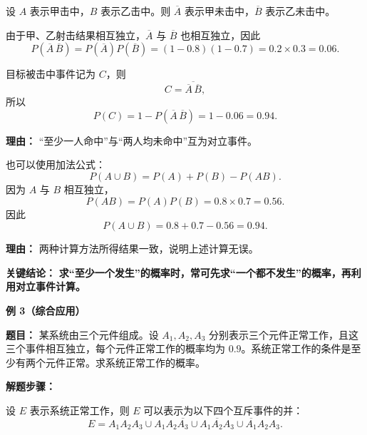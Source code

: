 \begin{examplebox}
\begin{description}[style=nextline, leftmargin=2.8em, labelsep=0.5em, itemsep=0.45em]
    \item[\textbf{第一步（求均不命中概率）：}]
    设 $A$ 表示甲击中，$B$ 表示乙击中。则 $\overline{A}$ 表示甲未击中，$\overline{B}$ 表示乙未击中。

    由于甲、乙射击结果相互独立，$\overline{A}$ 与 $\overline{B}$ 也相互独立，因此
    \[
        P(\overline{A}\,\overline{B})
        =
        P(\overline{A})P(\overline{B})
        =
        (1-0.8)(1-0.7)
        =
        0.2\times 0.3
        =
        0.06.
    \]

    \item[\textbf{第二步（利用对立事件）：}]
    目标被击中事件记为 $C$，则
    \[
        C=\overline{\overline{A}\,\overline{B}},
    \]
    所以
    \[
        P(C)
        =
        1-P(\overline{A}\,\overline{B})
        =
        1-0.06
        =
        0.94.
    \]

    \par\textbf{理由：}
    “至少一人命中”与“两人均未命中”互为对立事件。

    \item[\textbf{第三步（换一种方法核对结果）：}]
    也可以使用加法公式：
    \[
        P(A\cup B)
        =
        P(A)+P(B)-P(AB).
    \]
    因为 $A$ 与 $B$ 相互独立，
    \[
        P(AB)=P(A)P(B)=0.8\times 0.7=0.56.
    \]
    因此
    \[
        P(A\cup B)
        =
        0.8+0.7-0.56
        =
        0.94.
    \]

    \par\textbf{理由：}
    两种计算方法所得结果一致，说明上述计算无误。

\end{description}

\textbf{\textcolor{CExample}{关键结论：}}
\textbf{求“至少一个发生”的概率时，常可先求“一个都不发生”的概率，再利用对立事件计算。}

\medskip

\textbf{\textcolor{CExample}{例 3（综合应用）}}

\textbf{\textcolor{CExample}{题目：}}
某系统由三个元件组成。设 $A_1,A_2,A_3$ 分别表示三个元件正常工作，且这三个事件相互独立，每个元件正常工作的概率均为 $0.9$。系统正常工作的条件是至少有两个元件正常。求系统正常工作的概率。

\textbf{\textcolor{CExample}{解题步骤：}}

\begin{description}[style=nextline, leftmargin=2.8em, labelsep=0.5em, itemsep=0.45em]

    \item[\textbf{第一步（事件分解）：}]
    设 $E$ 表示系统正常工作，则 $E$ 可以表示为以下四个互斥事件的并：
    \[
        E
        =
        A_1A_2A_3
        \cup
        A_1A_2\overline{A_3}
        \cup
        A_1\overline{A_2}A_3
        \cup
        \overline{A_1}A_2A_3.
    \]


\end{description}
\end{examplebox}
